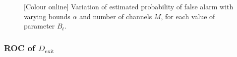 \documentclass[11pt]{article}
\begin{document}
\begin{figure}[h]
\caption{[Colour online] Variation of estimated probability of false alarm with varying bounds $\alpha$ and number of channels $M$, for each value of parameter $B_{t}$.}
\label{fig:MCdexit}
\end{figure}


\subsubsection{ROC of $D_{\text{exit}}$}
\label{subsubsec:exitDetector_roc}
\end{document}
